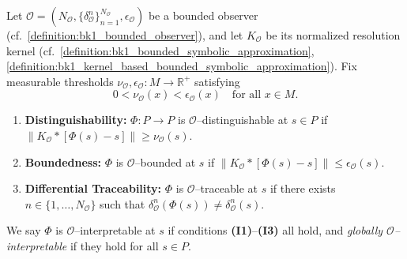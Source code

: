 \begin{definition}
\label{definition:bk1_observer_relative_interpretability}

Let $\mathcal{O} = (N_{\mathcal{O}}, \{\delta^n_{\mathcal{O}}\}_{n=1}^{N_{\mathcal{O}}}, \epsilon_{\mathcal{O}})$ be a bounded observer (cf.~\ref{definition:bk1_bounded_observer}),  
and let $K_{\mathcal{O}}$ be its normalized resolution kernel (cf.~\ref{definition:bk1_bounded_symbolic_approximation}, \ref{definition:bk1_kernel_based_bounded_symbolic_approximation}).  
Fix measurable thresholds $\nu_{\mathcal{O}}, \epsilon_{\mathcal{O}} : M \to \mathbb{R}^+$ satisfying
\[
0 < \nu_{\mathcal{O}}(x) < \epsilon_{\mathcal{O}}(x) \quad \text{for all } x \in M.
\]

\begin{enumerate}[label=\textbf{(I\arabic*)}]
\item \textbf{Distinguishability:} $\Phi : P \to P$ is $\mathcal{O}$–distinguishable at $s \in P$ if  
      $\|K_{\mathcal{O}} \ast [\Phi(s) - s]\| \ge \nu_{\mathcal{O}}(s)$.

\item \textbf{Boundedness:} $\Phi$ is $\mathcal{O}$–bounded at $s$ if  
      $\|K_{\mathcal{O}} \ast [\Phi(s) - s]\| \le \epsilon_{\mathcal{O}}(s)$.

\item \textbf{Differential Traceability:} $\Phi$ is $\mathcal{O}$–traceable at $s$ if  
      there exists $n \in \{1, \ldots, N_{\mathcal{O}}\}$ such that  
      $\delta^n_{\mathcal{O}}(\Phi(s)) \ne \delta^n_{\mathcal{O}}(s)$.
\end{enumerate}

We say $\Phi$ is $\mathcal{O}$–interpretable at $s$ if conditions \textbf{(I1)}–\textbf{(I3)} all hold,  
and \emph{globally $\mathcal{O}$–interpretable} if they hold for all $s \in P$.  

\end{definition}

\vspace{1em}


